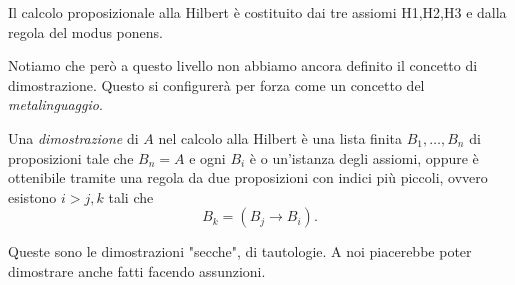 \documentclass[11pt]{scrartcl}
\begin{document}
	\begin{definition}
		Il calcolo proposizionale alla Hilbert è costituito dai tre assiomi H1,H2,H3 e dalla regola del modus ponens.
	\end{definition}
	Notiamo che però a questo livello non abbiamo ancora definito il concetto di dimostrazione. Questo si configurerà per forza come un concetto del \textit{metalinguaggio}.
	\begin{definition}[Dimostrazione]
		Una \textit{dimostrazione} di $A$ nel calcolo alla Hilbert è una lista finita $B_1,\dots,B_n$ di proposizioni tale che $B_n=A$ e ogni $B_i$ è o un'istanza degli assiomi, oppure è ottenibile tramite una regola da due proposizioni con indici più piccoli, ovvero esistono $i>j,k$ tali che
		$$B_k=\left(B_j\to B_i\right).$$
	\end{definition}
	
	Queste sono le dimostrazioni "secche", di tautologie. A noi piacerebbe poter dimostrare anche fatti facendo assunzioni.
	
\end{document}
